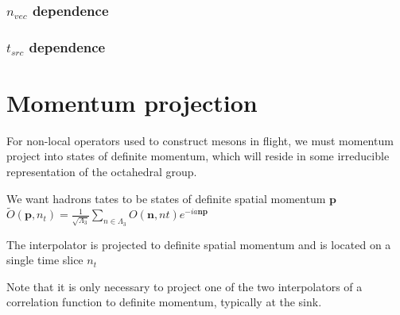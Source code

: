 \subsubsection{$n_{vec}$ dependence}

\subsubsection{$t_{src}$ dependence}

\subsection{}




\section{Momentum projection}
For non-local operators used to construct mesons in flight, we must momentum project into states of definite momentum, which will reside in some irreducible representation of the octahedral group. 

We want hadrons tates to be states of definite spatial momentum $\textbf{p}$ 
$\tilde{O}(\textbf{p},n_t) = \frac{1}{\sqrt{\Lambda_3}} \sum_{n\in\Lambda_3} O(\textbf{n},nt)e^{-ia\textbf{np}}$ 

The interpolator is projected to definite spatial momentum and is located on a single time slice $n_t$

Note that it is only necessary to project one of the two interpolators of a correlation function to definite momentum, typically at the sink. 




